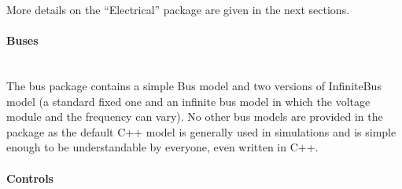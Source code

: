 \documentclass[a4paper, 12pt]{report}
\begin{document}
More details on the ``Electrical'' package are given in the next sections.

\paragraph{Buses}
~~\\

The bus package contains a simple Bus model and two versions of InfiniteBus model (a standard fixed one and an infinite bus model in which the voltage module and the frequency can vary). No other bus models are provided in the package as the default C++ model is generally used in \Dynawo simulations and is simple enough to be understandable by everyone, even written in C++.

\paragraph{Controls}
~~\\
\end{document}
